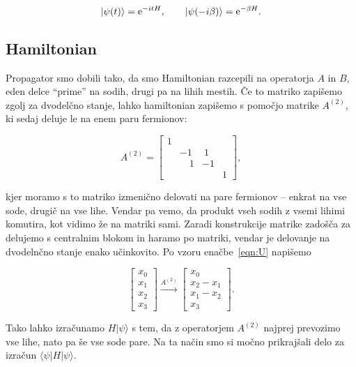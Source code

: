 \documentclass[a4 paper, 12pt]{article}
\begin{document}
\[
	|\psi(t)\rangle = \text{e}^{-itH}, \qquad |\psi(-i\beta)\rangle = \text{e}^{-\beta H}.
\]

\subsection{Hamiltonian}

Propagator smo dobili tako, da smo Hamiltonian razcepili na operatorja $A$ in $B$, eden delce "`prime"' na sodih,
drugi pa na lihih mestih. Če to matriko zapišemo zgolj za dvodelčno stanje, lahko hamiltonian zapišemo s pomočjo
matrike $A^{(2)}$, ki sedaj deluje le na enem paru fermionov:

\[
	A^{(2)} = \begin{bmatrix}
		1 &  &  &  \\
		&-1 &\ 1 &  \\
		 & \quad 1 & -1 &  \\
		 &  &  & 1
		\end{bmatrix},
\]

kjer moramo s to matriko izmenično delovati na pare fermionov -- enkrat na vse sode, drugič na vse lihe. Vendar pa vemo,
da produkt vseh sodih z vsemi lihimi komutira, kot vidimo že na matriki sami. Zaradi konstrukcije matrike zadošča
za delujemo s centralnim blokom in haramo po matriki, vendar je delovanje na dvodelnčno stanje enako učinkovito. Po
vzoru enačbe~\eqref{eqn:U} napišemo

\begin{equation}
	\begin{bmatrix}
		x_0 \\
		x_1 \\
		x_2 \\
		x_3
	\end{bmatrix} \stackrel{A^{(2)}}{\longrightarrow}
	\begin{bmatrix}
		x_0 \\
		x_2 - x_1 \\
		x_1 - x_2 \\
		x_3
	\end{bmatrix}.
\end{equation}

Tako lahko izračunamo $H|\psi\rangle$ s tem, da z operatorjem $A^{(2)}$ najprej prevozimo vse lihe, nato pa še vse sode
pare. Na ta način smo si močno prikrajšali delo za izračun $\langle\psi | H | \psi\rangle$.
\end{document}
